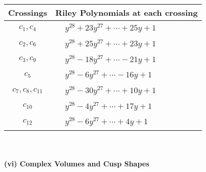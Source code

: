 \documentclass[1p]{elsarticle_modified}
\theoremstyle{definition}
\begin{document}
\begin{tabular}{m{50pt}|m{274pt}}
Crossings & \hspace{64pt}Riley Polynomials at each crossing \\
\hline $$\begin{aligned}c_{1},c_{4}\end{aligned}$$&$\begin{aligned}
&y^{28}+23 y^{27}+\cdots+25 y+1
\end{aligned}$\\
\hline $$\begin{aligned}c_{2},c_{6}\end{aligned}$$&$\begin{aligned}
&y^{28}+25 y^{27}+\cdots+23 y+1
\end{aligned}$\\
\hline $$\begin{aligned}c_{3},c_{9}\end{aligned}$$&$\begin{aligned}
&y^{28}-18 y^{27}+\cdots-21 y+1
\end{aligned}$\\
\hline $$\begin{aligned}c_{5}\end{aligned}$$&$\begin{aligned}
&y^{28}-6 y^{27}+\cdots-16 y+1
\end{aligned}$\\
\hline $$\begin{aligned}c_{7},c_{8},c_{11}\end{aligned}$$&$\begin{aligned}
&y^{28}-30 y^{27}+\cdots+10 y+1
\end{aligned}$\\
\hline $$\begin{aligned}c_{10}\end{aligned}$$&$\begin{aligned}
&y^{28}-4 y^{27}+\cdots+17 y+1
\end{aligned}$\\
\hline $$\begin{aligned}c_{12}\end{aligned}$$&$\begin{aligned}
&y^{28}-6 y^{27}+\cdots+4 y+1
\end{aligned}$\\
\hline
\end{tabular}\\~\\
\newpage\flushleft \textbf{(vi) Complex Volumes and Cusp Shapes}
\end{document}

